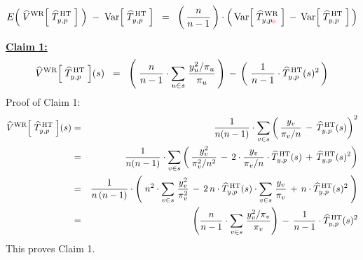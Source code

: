 \vskip 0.5cm
\begin{proposition}
\begin{equation*}
E\!\left(\;\widehat{V}^{\textnormal{WR}}\!\left[\;\widehat{T}^{\,\textnormal{HT}}_{y,p}\;\right]\;\right)
\; - \; \textnormal{Var}\!\left[\;\widehat{T}^{\,\textnormal{HT}}_{y,p}\;\right]
\;\; = \;\;
	\left(\,\dfrac{n}{n-1}\,\right)
	\cdot
	\left(\,
		\textnormal{Var}\!\left[\;\widehat{T}^{\,\textnormal{WR}}_{y,p_{\color{red}0}}\;\right]
		\, - \,
		\textnormal{Var}\!\left[\;\widehat{T}^{\,\textnormal{HT}}_{y,p}\;\right]
		\,\right)
\end{equation*}
\end{proposition}
\proof
\vskip 0.1cm
\noindent
\underline{\textbf{Claim 1:}}
\begin{equation*}
\widehat{V}^{\textnormal{WR}}\!\left[\;\widehat{T}^{\,\textnormal{HT}}_{y,p}\;\right]\!(s)
\;\; = \;\;
	\left(\;\dfrac{n}{n-1}\cdot\underset{u \in s}{\sum}\;\dfrac{y_{u}^{2}/\pi_{u}}{\pi_{u}}\,\right)
	\,-\,
	\left(\;\dfrac{1}{n-1}\cdot\widehat{T}^{\,\textnormal{HT}}_{y,p}(s)^{2}\,\right)
\end{equation*}
Proof of Claim 1:
\begin{eqnarray*}
\widehat{V}^{\textnormal{WR}}\!\left[\;\widehat{T}^{\,\textnormal{HT}}_{y,p}\;\right]\!(s)
& = &
	\dfrac{1}{n(n-1)}\cdot \underset{v \in s}{\sum} \left(\,
		\dfrac{y_{v}}{\pi_{v}/n}
		\, - \,
		\widehat{T}^{\,\textnormal{HT}}_{y,p}(s)
		\right)^{2}
\\
& = &
	\dfrac{1}{n(n-1)}\cdot \underset{v \in s}{\sum} \left(\,
		\dfrac{y_{v}^{2}}{\pi_{v}^{2}/n^{2}}
		\, - \,
		2 \cdot
		\dfrac{y_{v}}{\pi_{v}/n}
		\cdot
		\widehat{T}^{\,\textnormal{HT}}_{y,p}(s)
		\, + \,
		\widehat{T}^{\,\textnormal{HT}}_{y,p}(s)^{2}
		\right)
\\
& = &
	\dfrac{1}{n\,(n-1)} \cdot \left(\;
		n^{2} \cdot \underset{v \in s}{\sum}\;\dfrac{y_{v}^{2}}{\pi_{v}^{2}}
		\, - \,
		2\,n
		\cdot \widehat{T}^{\,\textnormal{HT}}_{y,p}(s) 
		\cdot \underset{v \in s}{\sum}\;\dfrac{y_{v}}{\pi_{v}}
		\, + \,
		n \cdot \widehat{T}^{\,\textnormal{HT}}_{y,p}(s)^{2}
		\;\right)
\\
& = &
	\left(\dfrac{n}{n-1}\cdot\underset{v \in s}{\sum}\;\dfrac{y_{v}^{2}/\pi_{v}}{\pi_{v}}\right)
	\, - \,
	\dfrac{1}{n-1} \cdot \widehat{T}^{\,\textnormal{HT}}_{y,p}(s)^{2}
\end{eqnarray*}
This proves Claim 1.

